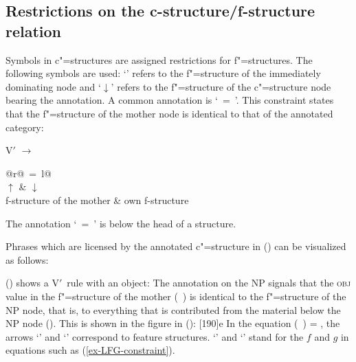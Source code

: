 \subsection{Restrictions on the c-structure/f-structure relation}

\largerpage
Symbols in c"=structures are assigned restrictions for f"=structures. The following symbols are used: `\up'\is{$\uparrow$} refers to the f"=structure of the
immediately dominating node and `$\downarrow$'\is{$\downarrow$} refers to the f"=structure of the c"=structure node bearing the annotation. A common annotation is
`\up~=~\down'. This constraint states that the f"=structure of the mother node is identical to that of the annotated category:

\ea
V$'$ $\to$ \begin{tabular}[t]{@{}r@{~=~}l@{}}
           \\
           $\uparrow$ &  $\downarrow$\\ 
           f-structure of the mother & own f-structure\\
           \end{tabular}
\z
The annotation `\up~=~\down' is below the head of a structure.

Phrases which are licensed by the annotated c"=structure in () can be visualized as follows:
\ea
{}%
\hspace*{3em}%
\z

\noindent
() shows a V$'$~rule with an object:
\ea
{}
\z
%
The annotation on the NP signals that the \textsc{obj} value in the f"=structure of the mother
\mbox{(\up\ \lfgobj)} is identical to the f"=structure of the NP node, that is, to everything that is
contributed from the material below the NP node (\down). 
This is shown in the figure in ():
\ea
{}%
\hspace*{3em}%
[190]{e}
\z
In the equation (\up\ \lfgobj) = \down{},  the arrows `\up' and `\down' correspond to feature structures. `\up' and
`\down' stand for the $f$ and $g$ in equations such as (\ref{ex-LFG-constraint}).

